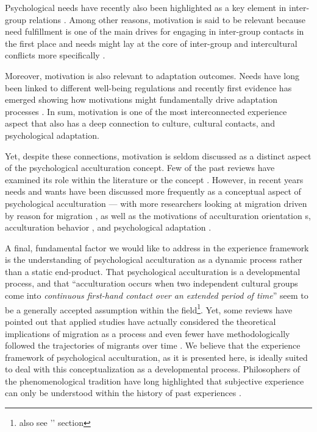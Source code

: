 \documentclass[nobib]{tufte-handout}
\begin{document}
Psychological needs have recently also been highlighted as a key element in inter-group relations \citep{Dovidio2017}. Among other reasons, motivation is said to be relevant because need fulfillment is one of the main drives for engaging in inter-group contacts in the first place \citep{Kitayama2007} and needs might lay at the core of inter-group and intercultural conflicts more specifically \citep{Hassler2021, Shnabel2008a}.

Moreover, motivation is also relevant to adaptation outcomes. Needs have long been linked to different well-being regulations \citep[e.g.,][]{Steverink2006} and recently first evidence has emerged showing how motivations might fundamentally drive adaptation processes \citep{Dignath2020}. 
In sum, motivation is one of the most interconnected experience aspect that also has a deep connection to culture, cultural contacts, and psychological adaptation.

Yet, despite these connections, motivation is seldom discussed as a distinct aspect of the psychological acculturation concept. Few of the past reviews have examined its role within the literature or the concept \citep[including, ][]{Ward2001a, Ward2019}. However, in recent years needs and wants have been discussed more frequently as a conceptual aspect of psychological acculturation --- with more researchers looking at migration driven by reason for migration \citep{Sandu2018}, as well as the motivations of acculturation orientation s\citep{Recker2017a}, acculturation behavior \citep{Reece2000}, and psychological adaptation \citep{Safdar2003}. 

A final, fundamental factor we would like to address in the experience framework is the understanding of psychological acculturation as a dynamic process rather than a static end-product. That psychological acculturation is a developmental process, and that ``acculturation occurs when two independent cultural groups come into \textit{continuous first-hand contact over an extended period of time}'' \citep[][186]{Berry1989} seem to be a generally accepted assumption within the field\footnote{also see '' section}. Yet, some reviews have pointed out that applied studies have actually considered the theoretical implications of migration as a process and even fewer have methodologically followed the trajectories of migrants over time \citep[e.g.,][]{Brown2011, Ward2019}. We believe that the experience framework of psychological acculturation, as it is presented here, is ideally suited to deal with this conceptualization as a developmental process. Philosophers of the phenomenological tradition have long highlighted that subjective experience can only be understood within the history of past experiences \citep[e.g.,][]{Heidegger1867}. 
\end{document}
